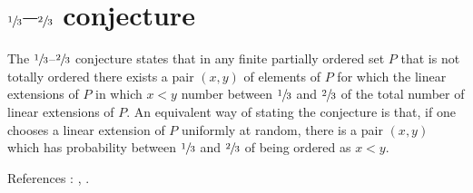 \section{$\sfrac{1}{3}$--$\sfrac{2}{3}$ conjecture}

The $\sfrac{1}{3}$--$\sfrac{2}{3}$ conjecture states that in any finite partially ordered set $P$ that is not totally ordered there exists a pair $(x,y)$ of elements of $P$ for which the linear extensions of $P$ in which $x < y$ number between $\sfrac{1}{3}$ and $\sfrac{2}{3}$ of the total number of linear extensions of $P$. An equivalent way of stating the conjecture is that, if one chooses a linear extension of $P$ uniformly at random, there is a pair $(x,y)$ which has probability between $\sfrac{1}{3}$ and $\sfrac{2}{3}$ of being ordered as $x < y$.


References : \cite{kral2013new}, \cite{zaguia20111}.